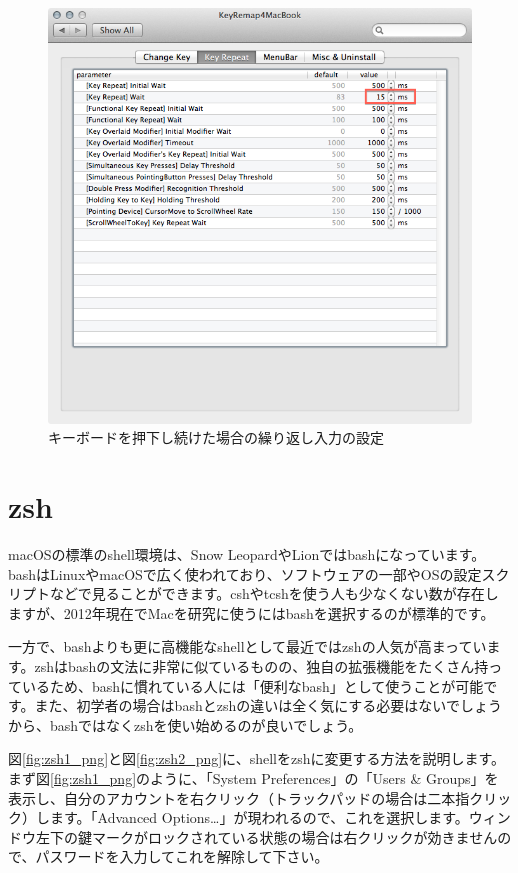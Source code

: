 \begin{figure}
  \centering
  \includegraphics[scale=0.35]{fig/KeyRemap4MacBook2.png}
  \caption{キーボードを押下し続けた場合の繰り返し入力の設定}
  \label{fig:KeyRemap4MacBook2_png}
\end{figure}

\section{zsh}

macOSの標準のshell環境は、Snow LeopardやLionではbashになっています。bashはLinuxやmacOSで広く使われており、ソフトウェアの一部やOSの設定スクリプトなどで見ることができます。cshやtcshを使う人も少なくない数が存在しますが、2012年現在でMacを研究に使うにはbashを選択するのが標準的です。

一方で、bashよりも更に高機能なshellとして最近ではzshの人気が高まっています。zshはbashの文法に非常に似ているものの、独自の拡張機能をたくさん持っているため、bashに慣れている人には「便利なbash」として使うことが可能です。また、初学者の場合はbashとzshの違いは全く気にする必要はないでしょうから、bashではなくzshを使い始めるのが良いでしょう。

図\ref{fig:zsh1_png}と図\ref{fig:zsh2_png}に、shellをzshに変更する方法を説明します。まず図\ref{fig:zsh1_png}のように、「System Preferences」の「Users \& Groups」を表示し、自分のアカウントを右クリック（トラックパッドの場合は二本指クリック）します。「Advanced Options\ldots」が現われるので、これを選択します。ウィンドウ左下の鍵マークがロックされている状態の場合は右クリックが効きませんので、パスワードを入力してこれを解除して下さい。

